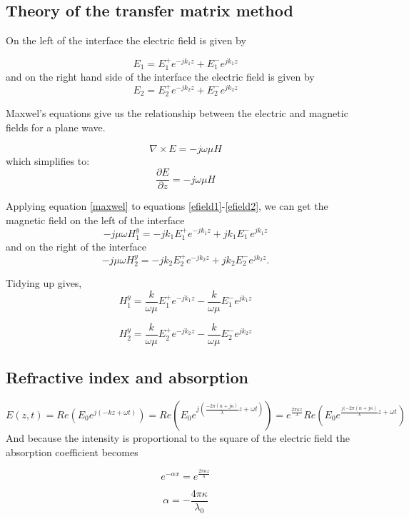 \subsection{Theory of the transfer matrix method}
On the left of the interface the electric field is given by

\begin{equation}
E_{1}=E^{+}_{1} e^{-j k_1 z}+E^{-}_{1} e^{j k_1 z}
\label{efield1}
\end{equation}
and on the right hand side of the interface the electric field is given by
\begin{equation}
E_{2}=E^{+}_{2} e^{-j k_2 z}+E^{-}_{2} e^{j k_2 z}
\label{efield2}
\end{equation}

Maxwel's equations give us the relationship between the electric and magnetic fields for a plane wave.

\begin{equation}
\nabla \times E=-j\omega \mu H 
\end{equation}
which simplifies to:
\begin{equation}
\frac{\partial E} {\partial z}=-j\omega \mu H 
\label{maxwel}
\end{equation}

Applying equation \ref{maxwel} to equations \ref{efield1}-\ref{efield2}, we can get the magnetic field on the left of the interface
\begin{equation}
-j \mu \omega H^{y}_{1}=-j k_1 E^{+}_{1} e^{-j k_1 z}+j k_1 E^{-}_{1} e^{j k_1 z}
\end{equation}
and on the right of the interface
\begin{equation}
-j \mu \omega H^{y}_{2}=-j k_2 E^{+}_{2} e^{-j k_2 z}+j k_2 E^{-}_{2} e^{j k_2 z}.
\end{equation}

Tidying up gives,
\begin{equation}
H^{y}_{1}=\frac{k}{\omega \mu}E^{+}_{1} e^{-j k_1 z}-\frac{k}{\omega \mu} E^{-}_{1} e^{j k_1 z}
\end{equation}

\begin{equation}
H^{y}_{2}=\frac{k}{\omega \mu}E^{+}_{2} e^{-j k_2 z}-\frac{k}{\omega \mu} E^{-}_{2} e^{j k_2 z}
\end{equation}


\subsection{Refractive index and absorption}
\begin{equation}
E(z,t)=Re(E_0 e^{j(-kz+\omega t)})= Re(E_0 e^{j(\frac{-2 \pi (n+j\kappa)}{\lambda}z + \omega t)})=e^{\frac{2\pi\kappa z}{\lambda}}Re(E_0 e^{\frac{j(-2 \pi (n+j\kappa)}{\lambda}z +\omega t})
\end{equation}
And because the intensity is proportional to the square of the electric field the absorption coefficient becomes

\begin{equation}
e^{-\alpha x}=e^{\frac{2\pi\kappa z}{\lambda}}
\end{equation}

\begin{equation}
\alpha=-\frac{4\pi\kappa}{\lambda_0}
\end{equation}


\newpage
\vfill

